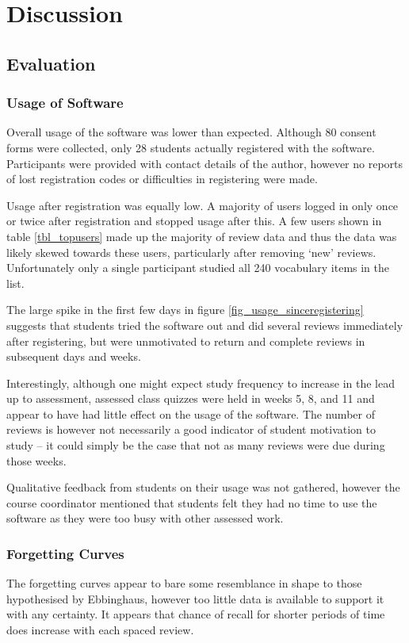 \chapter{Discussion}


\section{Evaluation}
\subsection{Usage of Software}
Overall usage of the software was lower than expected. Although 80 consent forms were
collected, only 28 students actually registered with the software. Participants were
provided with contact details of the author, however no reports of lost registration
codes or difficulties in registering were made.

Usage after registration was equally low. A majority of users logged in only once or twice
after registration and stopped usage after this. A few users shown in table \ref{tbl_topusers}
made up the majority of review data and thus the data was likely skewed towards these users,
particularly after removing `new' reviews. Unfortunately only a single participant studied all
240 vocabulary items in the list.

The large spike in the first few days in figure \ref{fig_usage_sinceregistering} suggests
that students tried the software out and did several reviews immediately after registering, but were
unmotivated to return and complete reviews in subsequent days and weeks.

Interestingly, although one might expect study frequency to increase in the lead up to
assessment, assessed class quizzes were held in weeks 5, 8, and 11 and appear to have had little effect on the
usage of the software. The number of reviews is however not necessarily a good indicator of student
motivation to study -- it could simply be the case that not as many reviews were due during those weeks.

Qualitative feedback from students on their usage was not gathered, however the
course coordinator mentioned that students felt they had no time to use the software
as they were too busy with other assessed work.


\subsection{Forgetting Curves}
The forgetting curves appear to bare some resemblance in shape to those hypothesised
by Ebbinghaus, however too little data is available to support it with any certainty.
It appears that chance of recall for shorter periods of time does increase with each
spaced review.

